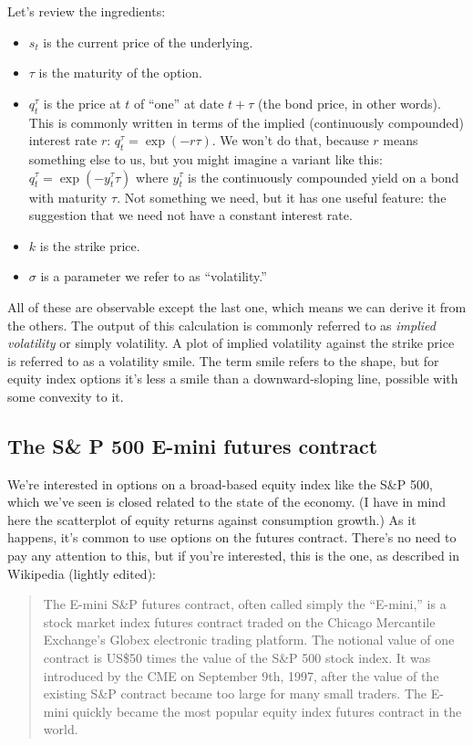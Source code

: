 \documentclass[11pt]{article}
\begin{document}
Let's review the ingredients:
\begin{itemize}
\item $s_t$ is the current price of the underlying.
\item $\tau$ is the maturity of the option.
\item $q_t^\tau$ is the price at $t$ of ``one'' at date $t+\tau$  (the bond price, in other words).
This is commonly written in terms of the implied (continuously compounded) interest rate $r$:
$q_t^\tau = \exp(-r \tau)$.
We won't do that, because $r$ means something else to us, but you might imagine
a variant like this:  $q_t^\tau = \exp(-y_t^\tau \tau)$
where $y_t^\tau$ is the continuously compounded yield on a bond with maturity $\tau$.
Not something we need, but it has one useful feature:
the suggestion that we need not have a constant interest rate.
\item $k$ is the strike price.
\item $\sigma$ is a parameter we refer to as ``volatility.''
\end{itemize}
All of these are observable except the last one,
which means we can derive it from the others.
The output of this calculation is commonly referred to as {\it implied volatility\/}
or simply volatility.
A plot of implied volatility against the strike price
is referred to as a volatility smile.
The term smile refers to the shape, but for equity index options
it's less a smile than a downward-sloping line, possible with some
convexity to it.


\subsection*{The S\& P 500 E-mini futures contract}

We're interested in options on a broad-based equity index
like the S\&P 500,
which we've seen is closed related to the state of the economy.
(I have in mind here the scatterplot of equity returns against
consumption growth.)
As it happens, it's common to use options on the futures contract.
There's no need to pay any attention to this,
but if you're interested, this is the one,
as described in Wikipedia (lightly edited):
%
\begin{quote}
The E-mini S\&P futures contract,
often called simply the ``E-mini,''
is a stock market index futures contract traded
on the Chicago Mercantile Exchange's Globex electronic trading platform.
The notional value of one contract is US\$50 times the value of the S\&P 500 stock index.
It was introduced by the CME on September 9th, 1997,
after the value of the existing S\&P contract became too large for many small traders.
The E-mini quickly became the most popular equity index futures contract in the world.
\end{quote}
\end{document}
